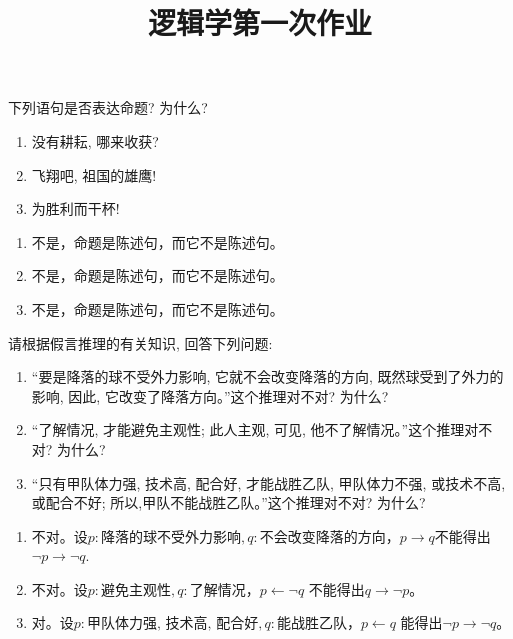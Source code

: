 \documentclass{ctexart}
\title{逻辑学第一次作业}
\newif\ifpreface
\begin{document}
\large
\setlength{\baselineskip}{1.2em}
\ifpreface
  
  \newgeometry{left=2cm,right=2cm,top=2cm,bottom=2cm}
\else
  \maketitle
\fi
\begin{problem}\label{pro:1}
  下列语句是否表达命题? 为什么?
  \begin{enumerate}
    \item 没有耕耘, 哪来收获?
    \item 飞翔吧, 祖国的雄鹰!
    \item 为胜利而干杯!
  \end{enumerate}
\end{problem}

\begin{solution}
  \begin{enumerate}
    \item 不是，命题是陈述句，而它不是陈述句。
    \item 不是，命题是陈述句，而它不是陈述句。
    \item 不是，命题是陈述句，而它不是陈述句。
  \end{enumerate}

\end{solution}
\begin{problem}\label{pro:2}
  请根据假言推理的有关知识, 回答下列问题:
  \begin{enumerate}
    \item “要是降落的球不受外力影响, 它就不会改变降落的方向, 既然球受到了外力的影响, 因此, 它改变了降落方向。”这个推理对不对? 为什么?
    \item “了解情况, 才能避免主观性; 此人主观, 可见, 他不了解情况。”这个推理对不对? 为什么?
    \item “只有甲队体力强, 技术高, 配合好, 才能战胜乙队, 甲队体力不强, 或技术不高, 或配合不好; 所以,甲队不能战胜乙队。”这个推理对不对? 为什么?
  \end{enumerate}
\end{problem}

\begin{solution}
  \begin{enumerate}
    \item 不对。设\(p:\text{降落的球不受外力影响}, q:\text{不会改变降落的方向}\)，\(p \to q\)不能得出\(\neg p \to \neg q\).
    \item 不对。设\(p:\text{避免主观性}, q: \text{了解情况}\)，\(p \leftarrow \neg q\) 不能得出\(q \to \neg p\)。
    \item 对。设\(p:\text{甲队体力强, 技术高, 配合好}, q: \text{能战胜乙队}\)，\(p \leftarrow q\) 能得出\(\neg p \to \neg q\)。
  \end{enumerate}

\end{solution}
\end{document}
